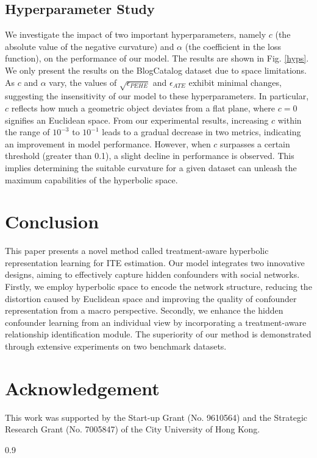 \documentclass[twoside,leqno,twocolumn]{article}
\begin{document}
\subsection{Hyperparameter Study}
We investigate the impact of two important hyperparameters, namely $c$ (the absolute value of the negative curvature) and $\alpha$ (the coefficient in the loss function), on the performance of our model.
The results are shown in Fig. \ref{hyps}. We only present the results on the BlogCatalog dataset due to space limitations. 
As $c$ and $\alpha$ vary, the values of $\sqrt{\epsilon_{PEHE}}$ and ${\epsilon_{ATE}}$ exhibit minimal changes, suggesting the insensitivity of our model to these hyperparameters.
In particular, $c$ reflects how much a geometric object deviates from a flat plane, where $c=0$ signifies an Euclidean space. 
From our experimental results, increasing $c$ within the range of $10^{-3}$ to $10^{-1}$ leads to a gradual decrease in two metrics, indicating an improvement in model performance. 
However, when $c$ surpasses a certain threshold (greater than 0.1), a slight decline in performance is observed. This implies determining the suitable curvature for a given dataset can unleash the maximum capabilities of the hyperbolic space.

\vspace{-0.5em}
\section{Conclusion}
This paper presents a novel method called treatment-aware hyperbolic representation learning for ITE estimation. Our model integrates two innovative designs, aiming to effectively capture hidden confounders with social networks. Firstly, we employ hyperbolic space to encode the network structure, reducing the distortion caused by Euclidean space and improving the quality of confounder representation from a macro perspective. Secondly, we enhance the hidden confounder learning from an individual view by incorporating a treatment-aware relationship identification module. The superiority of our method is demonstrated through extensive experiments on two benchmark datasets.
\vspace{-0.5em}
\section*{Acknowledgement}
This work was supported by the Start-up Grant (No. 9610564) and the Strategic Research Grant (No. 7005847) of the City University of Hong Kong.
\vspace{-0.5em}
\begin{spacing}{0.9} 


\end{spacing}
\end{document}
